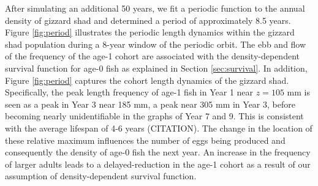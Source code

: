 \documentclass[preprint,review,12pt,authoryear]{elsarticle}
\begin{document}

After simulating an additional 50 years, we fit a periodic function to the annual density of gizzard shad and determined a period of approximately 8.5 years. 
Figure \ref{fig:period} illustrates the periodic length dynamics within the gizzard shad population during a 8-year window of the periodic orbit.  
The ebb and flow of the frequency of the age-1 cohort are associated with the density-dependent survival function for age-0 fish as explained in Section \ref{sec:survival}.
In addition, Figure \ref{fig:period} captures the cohort length dynamics of the gizzard shad. 
Specifically, the peak length frequency of age-1 fish in Year 1 near $z = 105$ mm is seen as a peak in Year 3 near 185 mm, a peak near 305 mm in Year 3, before becoming nearly unidentifiable in the graphs of Year 7 and 9.  
This is consistent with the average lifespan of 4-6 years (CITATION). 
The change in the location of these relative maximum influences the number of eggs being produced and consequently the density of age-0 fish the next year. 
An increase in the frequency of larger adults leads to a delayed-reduction in the age-1 cohort as a result of our  assumption of density-dependent survival function.

%
\end{document}
